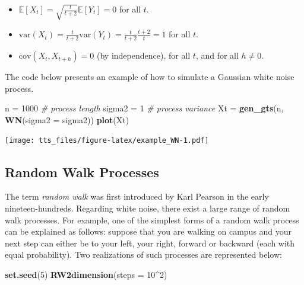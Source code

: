 \documentclass[]{book}
\newenvironment{Shaded}{\begin{snugshade}}{\end{snugshade}}
\newcommand{\CommentTok}[1]{\textcolor[rgb]{0.56,0.35,0.01}{\textit{#1}}}
\newcommand{\DataTypeTok}[1]{\textcolor[rgb]{0.13,0.29,0.53}{#1}}
\newcommand{\DecValTok}[1]{\textcolor[rgb]{0.00,0.00,0.81}{#1}}
\newcommand{\KeywordTok}[1]{\textcolor[rgb]{0.13,0.29,0.53}{\textbf{#1}}}
\newcommand{\NormalTok}[1]{#1}
\newcommand{\OperatorTok}[1]{\textcolor[rgb]{0.81,0.36,0.00}{\textbf{#1}}}
\newcommand{\StringTok}[1]{\textcolor[rgb]{0.31,0.60,0.02}{#1}}
\providecommand{\tightlist}{%
  \setlength{\itemsep}{0pt}\setlength{\parskip}{0pt}}
\theoremstyle{definition}
\theoremstyle{definition}
\theoremstyle{definition}
\theoremstyle{remark}
\begin{document}
\begin{itemize}
\tightlist
\item
  \(\mathbb{E}[X_t] = \sqrt{\frac{t}{t+2}} \mathbb{E}[Y_t] = 0\) for all
  \(t\).
\item
  \(\text{var}(X_t) = \frac{t}{t+2} \text{var}(Y_t) = \frac{t}{t+2} \frac{t+2}{t} = 1\)
  for all \(t\).
\item
  \(\text{cov}(X_t, X_{t+h}) = 0\) (by independence), for all \(t\), and
  for all \(h \neq 0\).
\end{itemize}

The code below presents an example of how to simulate a Gaussian white
noise process.

\begin{Shaded}
\begin{Highlighting}[]
\NormalTok{n =}\StringTok{ }\DecValTok{1000}                               \CommentTok{# process length}
\NormalTok{sigma2 =}\StringTok{ }\DecValTok{1}                             \CommentTok{# process variance}
\NormalTok{Xt =}\StringTok{ }\KeywordTok{gen_gts}\NormalTok{(n, }\KeywordTok{WN}\NormalTok{(}\DataTypeTok{sigma2 =}\NormalTok{ sigma2))}
\KeywordTok{plot}\NormalTok{(Xt)}
\end{Highlighting}
\end{Shaded}

\texttt{[image: tts\_files/figure-latex/example\_WN-1.pdf]}

\hypertarget{rw}{%
\subsection{Random Walk Processes}\label{rw}}

The term \emph{random walk} was first introduced by Karl Pearson in the
early nineteen-hundreds. Regarding white noise, there exist a large
range of random walk processes. For example, one of the simplest forms
of a random walk process can be explained as follows: suppose that you
are walking on campus and your next step can either be to your left,
your right, forward or backward (each with equal probability). Two
realizations of such processes are represented below:

\begin{Shaded}
\begin{Highlighting}[]
\KeywordTok{set.seed}\NormalTok{(}\DecValTok{5}\NormalTok{)}
\KeywordTok{RW2dimension}\NormalTok{(}\DataTypeTok{steps =} \DecValTok{10}\OperatorTok{^}\DecValTok{2}\NormalTok{)}
\end{Highlighting}
\end{Shaded}
\end{document}
